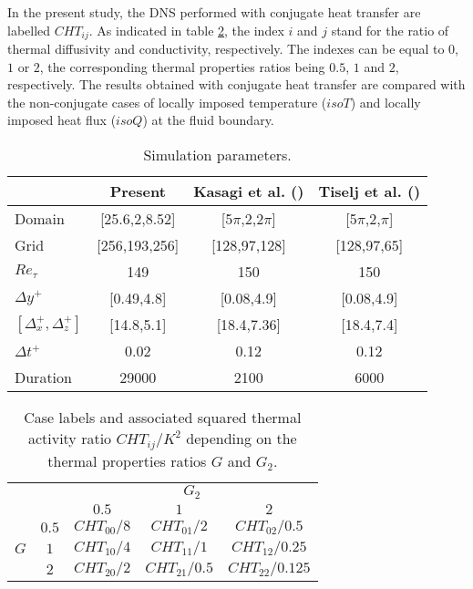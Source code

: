 \documentclass[review]{elsarticle}
\begin{document}
In the present study, the DNS performed with conjugate heat transfer are labelled $CHT_{ij}$.
As indicated in table \ref{tab-table2}, the index $i$ and $j$ stand for the ratio of thermal diffusivity and conductivity, respectively. The indexes can be equal to $0$, $1$ or $2$, the corresponding thermal properties ratios being $0.5$, $1$ and $2$, respectively.
The results obtained with conjugate heat transfer are compared with the non-conjugate cases of locally imposed temperature ($isoT$) and locally imposed heat flux ($isoQ$) at the fluid boundary.

\begin{table}[htbp]
\begin{center}
\begin{tabular}[htbp]{|l|c|c|c|}
\hline
          & Present & Kasagi et al. (\cite{kasagi1992direct}) & Tiselj et al. (\cite{Tiselj2001dns}) \\ \hline
Domain                     & [25.6,2,8.52] & [5$\pi$,2,2$\pi$] & [5$\pi$,2,$\pi$] \\ \hline
Grid                       & [256,193,256] & [128,97,128] & [128,97,65] \\ \hline
$Re_\tau$                  & 149 & 150 & 150 \\ \hline
$\Delta y^+$               & [0.49,4.8] & [0.08,4.9] & [0.08,4.9] \\ \hline
$[\Delta_x^+, \Delta_z^+]$ & [14.8,5.1] & [18.4,7.36] & [18.4,7.4] \\ \hline
$\Delta t^+$               & 0.02 & 0.12 & 0.12 \\ \hline
Duration                   & 29000 & 2100 & 6000 \\ \hline
\end{tabular}
\end{center}
\caption{Simulation parameters.}
\label{tab-table1}
\end{table}

\begin{table}[htbp]
\centering
\begin{tabular}{c|c|c|c|c|}
\multicolumn{2}{c}{} & \multicolumn{3}{c}{$G_2$} \\ \cline{3-5}
\multicolumn{2}{c|}{} & $0.5$ & $1$ & $2$ \\ \cline{2-5}
\multirow{3}{*}{$G$} & $0.5$ & $CHT_{00} / 8$ & $CHT_{01} / 2$ & $CHT_{02} / 0.5$ \\ \cline{2-5}
& $1$ & $CHT_{10} / 4$ & $CHT_{11} / 1$ & $CHT_{12} / 0.25$ \\ \cline{2-5}
& $2$ & $CHT_{20} / 2$ & $CHT_{21} / 0.5$ & $CHT_{22} / 0.125$ \\ \cline{2-5}
\end{tabular}
\caption{Case labels and associated squared thermal activity ratio $CHT_{ij} / K^2$ depending on the thermal properties ratios $G$ and $G_2$.} \label{tab-table2}
\end{table}
\end{document}
